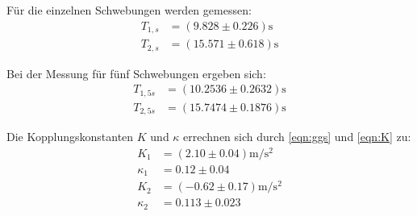 Für die einzelnen Schwebungen werden gemessen:
\begin{align*}
  T_{1,s} &= (9.828 \pm 0.226) \si{\second} \\
  T_{2,s} &= (15.571 \pm 0.618) \si{\second}
\end{align*}

Bei der Messung für fünf Schwebungen ergeben sich:
\begin{align*}
  T_{1,5s} &= (10.2536 \pm 0.2632) \si{\second}\\
  T_{2,5s} &= (15.7474 \pm 0.1876) \si{\second}
\end{align*}

Die Kopplungskonstanten $K$ und $\kappa$ errechnen sich durch \eqref{eqn:ggs} und \eqref{eqn:K} zu:
\begin{align*}
  K_{1} &= (2.10 \pm 0.04) \si{\meter\per\second\squared} \\
  \kappa_{1} &= 0.12 \pm 0.04\\
  K_{2} &= (-0.62 \pm 0.17) \si{\meter\per\second\squared}\\
  \kappa_{2} &= 0.113 \pm 0.023
\end{align*}
